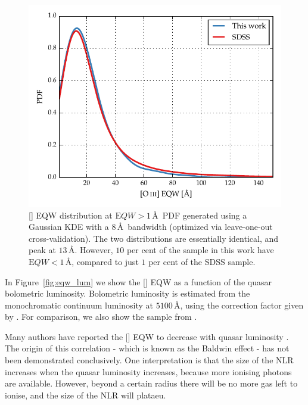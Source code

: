 \begin{figure}[t!]
    \centering 
    \includegraphics[width=\columnwidth]{figures/chapter04/high_eqw_comp.pdf} 
    \caption[{}]{[] EQW distribution at ${\mathrm EQW} > 1 $\,\AA\, PDF generated using a Gaussian KDE with a $8$\,\AA\, bandwidth (optimized via leave-one-out cross-validation). The two distributions are essentially identical, and peak at $13$\,\AA. However, $10$ per cent of the sample in this work have ${\mathrm EQW} < 1$\,\AA, compared to just $1$ per cent of the SDSS sample.}     
    \label{fig:high_eqw_comp}
\end{figure}

In Figure~\ref{fig:eqw_lum} we show the [] EQW as a function of the quasar bolometric luminosity. 
Bolometric luminosity is estimated from the monochromatic continuum luminosity at $5100$\,\AA, using the correction factor given by \citet{richards06}. 
For comparison, we also show the sample from \citet{shen11}.  

Many authors have reported the [] EQW to decrease with quasar luminosity \citep[e.g.][]{brotherton96,sulentic04,baskin05b}. 
The origin of this correlation - which is known as the Baldwin effect \citep[e.g.][]{baldwin77,brotherton96,zhang11,stern12} - has not been demonstrated conclusively. 
One interpretation is that the size of the NLR increases when the quasar luminosity increases, because more ionising photons are available. 
However, beyond a certain radius there will be no more gas left to ionise, and the size of the NLR will plataeu.

